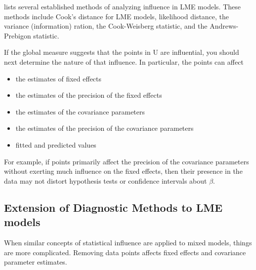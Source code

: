 \documentclass[12pt, a4paper]{report}
\theoremstyle{plain}
\theoremstyle{definition}
\theoremstyle{remark}
\begin{document}
\citet{Zewotir} lists several established methods of analyzing influence in LME models. These methods include Cook's distance for LME models,
 likelihood distance,
the variance (information) ration,
the  Cook-Weisberg statistic, and
the  Andrews-Prebigon statistic.

If the global measure suggests that the points in U are influential, you should next determine the nature of
that influence. In particular, the points can affect
\begin{itemize}
	\item the estimates of fixed effects
	\item the estimates of the precision of the fixed effects
	\item the estimates of the covariance parameters
	\item the estimates of the precision of the covariance parameters
	\item fitted and predicted values
\end{itemize}	

For example, if points primarily affect the precision of the covariance parameters without exerting much influence on the fixed effects, then their presence in the data may not distort hypothesis
tests or confidence intervals about $\beta$.





\subsection{Extension of Diagnostic Methods to LME models}

When similar concepts of statistical influence are applied to mixed models, things are more complicated. Removing data points affects fixed effects and covariance parameter estimates.

\end{document}
